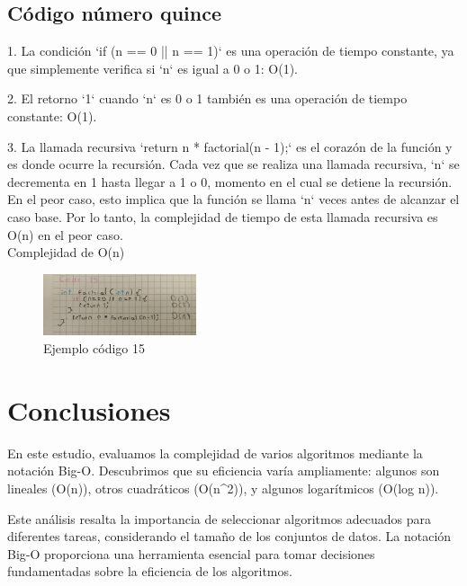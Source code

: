 \documentclass[journal, spanish]{IEEEtran}
\begin{document}
\subsection{Código número quince}
1. La condición `if (n == 0 || n == 1)` es una operación de tiempo constante, ya que simplemente verifica si `n` es igual a 0 o 1: O(1).

2. El retorno `1` cuando `n` es 0 o 1 también es una operación de tiempo constante: O(1).

3. La llamada recursiva `return n * factorial(n - 1);` es el corazón de la función y es donde ocurre la recursión. Cada vez que se realiza una llamada recursiva, `n` se decrementa en 1 hasta llegar a 1 o 0, momento en el cual se detiene la recursión. En el peor caso, esto implica que la función se llama `n` veces antes de alcanzar el caso base. Por lo tanto, la complejidad de tiempo de esta llamada recursiva es O(n) en el peor caso.\\

Complejidad de O(n)

\begin{figure}[H]
  \centering
  \includegraphics[width=0.4\textwidth]{WhatsApp Image 2023-09-11 at 8.03.47 PM.jpeg}
  \caption{Ejemplo código 15}
  

  \label{fig:imagen1}
\end{figure}

\section{Conclusiones}


En este estudio, evaluamos la complejidad de varios algoritmos mediante la notación Big-O. Descubrimos que su eficiencia varía ampliamente: algunos son lineales (O(n)), otros cuadráticos (O(n^2)), y algunos logarítmicos (O(log n)).

Este análisis resalta la importancia de seleccionar algoritmos adecuados para diferentes tareas, considerando el tamaño de los conjuntos de datos. La notación Big-O proporciona una herramienta esencial para tomar decisiones fundamentadas sobre la eficiencia de los algoritmos.
\end{document}
